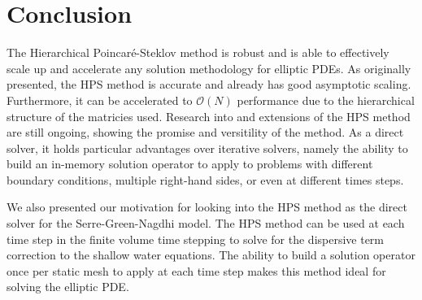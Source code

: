 \section{Conclusion}
\label{sec:conclusion}

The Hierarchical Poincaré-Steklov method is robust and is able to effectively scale up and accelerate any solution methodology for elliptic PDEs. As originally presented, the HPS method is accurate and already has good asymptotic scaling. Furthermore, it can be accelerated to $\mathcal{O}(N)$ performance due to the hierarchical structure of the matricies used. Research into and extensions of the HPS method are still ongoing, showing the promise and versitility of the method. As a direct solver, it holds particular advantages over iterative solvers, namely the ability to build an in-memory solution operator to apply to problems with different boundary conditions, multiple right-hand sides, or even at different times steps.

We also presented our motivation for looking into the HPS method as the direct solver for the Serre-Green-Nagdhi model. The HPS method can be used at each time step in the finite volume time stepping to solve for the dispersive term correction to the shallow water equations. The ability to build a solution operator once per static mesh to apply at each time step makes this method ideal for solving the elliptic PDE.
